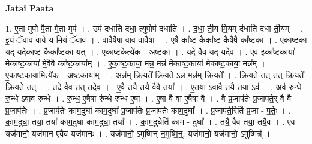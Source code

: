 \documentclass[17pt]{extarticle}
\begin{document}
\textbf{Jatai Paata} \newline

1. ए॒ता मुपो पै॒ता मे॒ता मुप॑ । . उप॑ दधाति दधा॒ त्युपोप॑ दधाति । . द॒धा॒ ती॒य मि॒यम् द॑धाति दधा ती॒यम् । . इ॒यं ॅवाव वावे य मि॒यं ॅवाव । . वावैषैषा वाव वावैषा । . ए॒षै का᳚ष्ट॒ कैका᳚ष्ट॒ कैषैषै का᳚ष्ट॒का । . ए॒का॒ष्ट॒का यद् यदे॑काष्ट॒ कैका᳚ष्ट॒का यत् । . ए॒का॒ष्ट॒केत्ये॑क - अ॒ष्ट॒का । . यदे॒ वैव यद् यदे॒व । . ए॒व इका᳚ष्ट॒काया॑ मेकाष्ट॒काया॑ मे॒वैवै का᳚ष्ट॒काया᳚म् । . ए॒का॒ष्ट॒काया॒ मन्न॒ मन्न॑ मेकाष्ट॒काया॑ मेकाष्ट॒काया॒ मन्न᳚म् । . ए॒का॒ष्ट॒काया॒मित्ये॑क - अ॒ष्ट॒काया᳚म् । . अन्न॑म् क्रि॒यते᳚ क्रि॒यते ऽन्न॒ मन्न॑म् क्रि॒यते᳚ । . क्रि॒यते॒ तत् तत् क्रि॒यते᳚ क्रि॒यते॒ तत् । . तदे॒ वैव तत् तदे॒व । . ए॒वै तयै॒ तयै॒ वैवै तया᳚ । . ए॒तया ऽवावै॒ तयै॒ तया ऽव॑ । . अव॑ रुन्धे रु॒न्धे ऽवाव॑ रुन्धे । . रु॒न्ध॒ ए॒षैषा रु॑न्धे रुन्ध ए॒षा । . ए॒षा वै वा ए॒षैषा वै । . वै प्र॒जाप॑तेः प्र॒जाप॑ते॒र् वै वै प्र॒जाप॑तेः । . प्र॒जाप॑तेः काम॒दुघा॑ काम॒दुघा᳚ प्र॒जाप॑तेः प्र॒जाप॑तेः काम॒दुघा᳚ । . प्र॒जाप॑ते॒रिति॑ प्र॒जा - प॒तेः॒ । . का॒म॒दुघा॒ तया॒ तया॑ काम॒दुघा॑ काम॒दुघा॒ तया᳚ । . का॒म॒दुघेति॑ काम - दुघा᳚ । . तयै॒ वैव तया॒ तयै॒व । . ए॒व यज॑मानो॒ यज॑मान ए॒वैव यज॑मानः । . यज॑मानो॒ ऽमुष्मि॑न् न॒मुष्मि॒न्॒. यज॑मानो॒ यज॑मानो॒ ऽमुष्मिन्न्॑ । \newline
\end{document}
